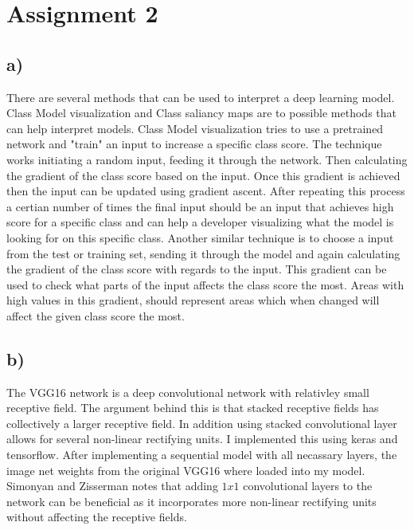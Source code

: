 \documentclass{article}
\begin{document}
\section{Assignment 2}
\subsection*{a)}
There are several methods that can be used to interpret a deep learning model. Class Model visualization and Class saliancy maps are to possible methods that can help interpret models. Class Model visualization tries to use a pretrained network and "train" an input to increase a specific class score. The technique works initiating a random input, feeding it through the network. Then calculating the gradient of the class score based on the input. Once this gradient is achieved then the input can be updated using gradient ascent. After repeating this process a certian number of times the final input should be an input that achieves high score for a specific class and can help a developer visualizing what the model is looking for on this specific class. Another similar technique is to choose a input from the test or training set, sending it through the model and again calculating the gradient of the class score with regards to the input. This gradient can be used to check what parts of the input affects the class score the most. Areas with high values in this gradient, should represent areas which when changed will affect the given class score the most. 
\subsection*{b)}
The VGG16 network is a deep convolutional network with relativley small receptive field. The argument behind this is that stacked receptive fields has collectively a larger receptive field.\cite[pp.2-3]{vgg16paper} In addition using stacked convolutional layer allows for several non-linear rectifying units. I implemented this using keras and tensorflow. After implementing a sequential model with all necassary layers, the image net weights from the original VGG16 where loaded into my model. Simonyan and Zisserman notes that adding $1x1$ convolutional layers to the network can be beneficial as it incorporates more non-linear rectifying units without affecting the receptive fields.\cite[pp.3]{vgg16paper}
\end{document}
